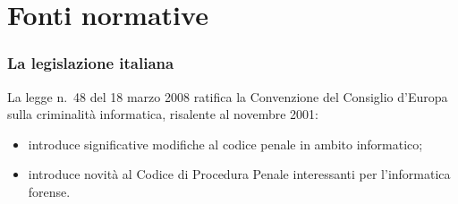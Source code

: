 \documentclass[11pt]{beamer}
\begin{document}
	
	\section{Fonti normative}
	\begin{frame}
		\frametitle{La legislazione italiana}
		La legge n.~48 del 18 marzo 2008\cite{L_48/2008_2016-03-04} ratifica la Convenzione del Consiglio d'Europa sulla criminalità informatica, risalente al novembre 2001:
		\begin{itemize}
			\item introduce significative modifiche al codice penale in ambito informatico;
			\item introduce novità al Codice di Procedura Penale interessanti per l'informatica forense.
		\end{itemize} 
	\end{frame}
	
\end{document}
